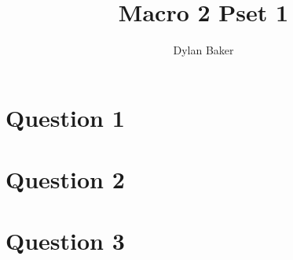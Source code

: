 \documentclass[10pt]{article}
\title{Macro 2 Pset 1}
\author{Dylan Baker}
\date{}
\begin{document}
\maketitle

\tableofcontents

\section{Question 1}


\pagebreak

\section{Question 2}


\section{Question 3}

\end{document}
